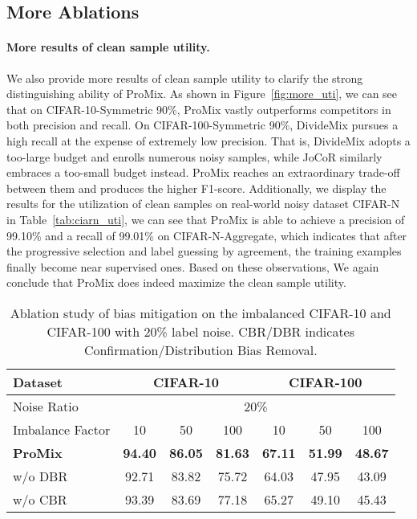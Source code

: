 \documentclass{article}
\begin{document}
\subsection{More Ablations}
\paragraph{More results of clean sample utility.}
We also provide more results of clean sample utility to clarify the strong distinguishing ability of ProMix.
As shown in Figure~\ref{fig:more_uti}, we can see that on CIFAR-10-Symmetric 90\%, ProMix vastly outperforms competitors in both precision and recall. On CIFAR-100-Symmetric 90\%, DivideMix pursues a high recall at the expense of extremely low precision. That is, DivideMix adopts a too-large budget and enrolls numerous noisy samples, while JoCoR similarly embraces a too-small budget instead. ProMix reaches an extraordinary trade-off between them and produces the higher F1-score. Additionally, we display the results for the utilization of clean samples on real-world noisy dataset CIFAR-N in Table~\ref{tab:ciarn_uti}, we can see that ProMix is able to achieve a precision of 99.10\% and a recall of 99.01\% on CIFAR-N-Aggregate, which indicates that after the progressive selection and label guessing by agreement, the training examples finally become near supervised ones. Based on these observations, We again conclude that ProMix does indeed maximize the clean sample utility. 

\begin{table}[!t]
    \centering
    \small
\tabcolsep=0.15cm
    \begin{tabular}{l|ccc|ccc}
        \toprule
        {Dataset} & \multicolumn{3}{c|}{CIFAR-10}  & \multicolumn{3}{c}{CIFAR-100} \\ \midrule 
        Noise Ratio & \multicolumn{6}{c}{20\%} \\
        \midrule
        Imbalance Factor & 10 & 50 & 100 & 10 & 50 & 100\\
        \midrule
        \textbf{ProMix}  & \textbf{94.40}& \textbf{86.05} & \textbf{81.63} & \textbf{67.11} & \textbf{51.99} & \textbf{48.67} \\
        w/o DBR & 92.71 & 83.82 & 75.72 & 64.03& 47.95 & 43.09 \\
        w/o CBR & 93.39 & 83.69 & 77.18 & 65.27& 49.10 & 45.43 \\
        \bottomrule
    \end{tabular}
    \caption{Ablation study of bias mitigation on the imbalanced CIFAR-10 and CIFAR-100 with 20\% label noise. CBR/DBR indicates Confirmation/Distribution Bias Removal. }
    \label{tab:ablation_imb}
\end{table}
\end{document}
